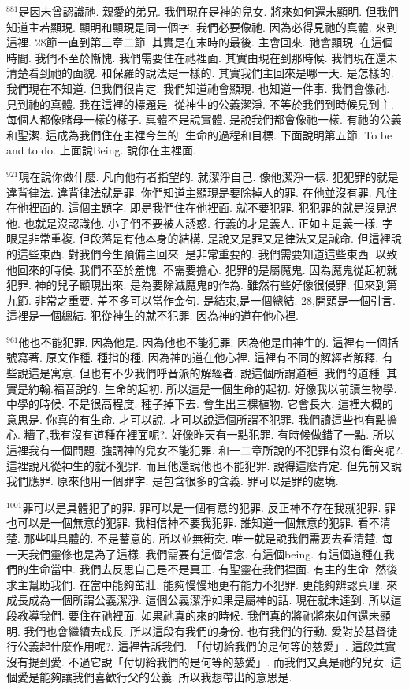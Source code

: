\documentclass{book}
\begin{document}
$^{881}$是因未曾認識祂.
親愛的弟兄.
我們現在是神的兒女.
將來如何還未顯明.
但我們知道主若顯現.
顯明和顯現是同一個字.
我們必要像祂.
因為必得見祂的真體.
來到這裡.
28節一直到第三章二節.
其實是在末時的最後.
主會回來.
祂會顯現.
在這個時間.
我們不至於慚愧.
我們需要住在祂裡面.
其實由現在到那時候.
我們現在還未清楚看到祂的面貌.
和保羅的說法是一樣的.
其實我們主回來是哪一天.
是怎樣的.
我們現在不知道.
但我們很肯定.
我們知道祂會顯現.
也知道一件事.
我們會像祂.
見到祂的真體.
我在這裡的標題是.
從神生的公義潔淨.
不等於我們到時候見到主.
每個人都像賭母一樣的樣子.
真體不是說實體.
是說我們都會像祂一樣.
有祂的公義和聖潔.
這成為我們住在主裡今生的.
生命的過程和目標.
下面說明第五節.
To be and to do.
上面說Being.
說你在主裡面.

$^{921}$現在說你做什麼.
凡向他有者指望的.
就潔淨自己.
像他潔淨一樣.
犯犯罪的就是違背律法.
違背律法就是罪.
你們知道主顯現是要除掉人的罪.
在他並沒有罪.
凡住在他裡面的.
這個主題字.
即是我們住在他裡面.
就不要犯罪.
犯犯罪的就是沒見過他.
也就是沒認識他.
小子們不要被人誘惑.
行義的才是義人.
正如主是義一樣.
字眼是非常重複.
但段落是有他本身的結構.
是說又是罪又是律法又是誡命.
但這裡說的這些東西.
對我們今生預備主回來.
是非常重要的.
我們需要知道這些東西.
以致他回來的時候.
我們不至於羞愧.
不需要擔心.
犯罪的是屬魔鬼.
因為魔鬼從起初就犯罪.
神的兒子顯現出來.
是為要除滅魔鬼的作為.
雖然有些好像很侵罪.
但來到第九節.
非常之重要.
差不多可以當作金句.
是結束,是一個總結.
28,開頭是一個引言.
這裡是一個總結.
犯從神生的就不犯罪.
因為神的道在他心裡.

$^{961}$他也不能犯罪.
因為他是.
因為他也不能犯罪.
因為他是由神生的.
這裡有一個括號寫著.
原文作種.
種指的種.
因為神的道在他心裡.
這裡有不同的解經者解釋.
有些說這是寓意.
但也有不少我們呼音派的解經者.
說這個所謂道種.
我們的道種.
其實是約翰.福音說的.
生命的起初.
所以這是一個生命的起初.
好像我以前讀生物學.
中學的時候.
不是很高程度.
種子掉下去.
會生出三棵植物.
它會長大.
這裡大概的意思是.
你真的有生命.
才可以說.
才可以說這個所謂不犯罪.
我們讀這些也有點擔心.
糟了,我有沒有道種在裡面呢?.
好像昨天有一點犯罪.
有時候做錯了一點.
所以這裡我有一個問題.
強調神的兒女不能犯罪.
和一二章所說的不犯罪有沒有衝突呢?.
這裡說凡從神生的就不犯罪.
而且他還說他也不能犯罪.
說得這麼肯定.
但先前又說我們應罪.
原來他用一個罪字.
是包含很多的含義.
罪可以是罪的處境.

$^{1001}$罪可以是具體犯了的罪.
罪可以是一個有意的犯罪.
反正神不存在我就犯罪.
罪也可以是一個無意的犯罪.
我相信神不要我犯罪.
誰知道一個無意的犯罪.
看不清楚.
那些叫具體的.
不是蓄意的.
所以並無衝突.
唯一就是說我們需要去看清楚.
每一天我們靈修也是為了這樣.
我們需要有這個信念.
有這個being.
有這個道種在我們的生命當中.
我們去反思自己是不是真正.
有聖靈在我們裡面.
有主的生命.
然後求主幫助我們.
在當中能夠茁壯.
能夠慢慢地更有能力不犯罪.
更能夠辨認真理.
來成長成為一個所謂公義潔淨.
這個公義潔淨如果是屬神的話.
現在就未達到.
所以這段教導我們.
要住在祂裡面.
如果祂真的來的時候.
我們真的將祂將來如何還未顯明.
我們也會繼續去成長.
所以這段有我們的身份.
也有我們的行動.
愛對於基督徒行公義起什麼作用呢?.
這裡告訴我們.
「付切給我們的是何等的慈愛」.
這段其實沒有提到愛.
不過它說「付切給我們的是何等的慈愛」.
而我們又真是祂的兒女.
這個愛是能夠讓我們喜歡行父的公義.
所以我想帶出的意思是.
\end{document}
